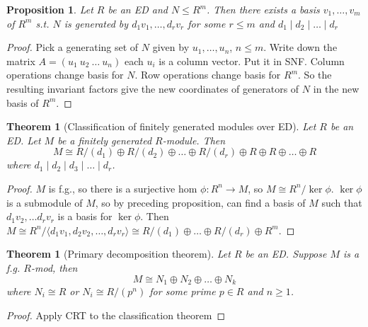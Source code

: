 \documentclass{article}
\theoremstyle{definition}
\theoremstyle{remark}
\theoremstyle{plain}
\newtheorem{thm}[defn]{Theorem}
\newtheorem{prop}[defn]{Proposition}
\theoremstyle{definition}
\begin{document}
\begin{prop}
    Let $R$ be an ED and $N\le R^m$. Then there exists a basis $v_1,\ldots,v_m$ of $R^m$ s.t. $N$ is generated by $d_1v_1,\ldots,d_rv_r$ for some $r\le m$ and $d_1\mid d_2\mid \ldots\mid d_r$
\end{prop}
\begin{proof}
    Pick a generating set of $N$ given by $u_1,\ldots, u_n$, $n\le m$. Write down the matrix $A=(u_1\ u_2\ \ldots\ u_n)$ each $u_i$ is a column vector. Put it in SNF. Column operations change basis for $N$. Row operations change basis for $R^m$. So the resulting invariant factors give the new coordinates of generators of $N$ in the new basis of $R^m$.
\end{proof}
\begin{thm}[Classification of finitely generated modules over ED]
    Let $R$ be an ED. Let $M$ be a finitely generated $R$-module. Then
    \[M\cong R/(d_1)\oplus R/(d_2)\oplus \ldots\oplus R/(d_r)\oplus R\oplus R\oplus\ldots\oplus R\]
    where $d_1\mid d_2\mid d_3\mid\ldots\mid d_r$.
\end{thm}
\begin{proof}
    $M$ is f.g., so there is a surjective hom $\phi:R^n\to M$, so $M\cong R^n/\ker\phi$. $\ker\phi$ is a submodule of $M$, so by preceding proposition, can find a basis of $M$ such that $d_1v_2,\ldots d_rv_r$ is a basis for $\ker\phi$. Then $M\cong R^n/\langle d_1v_1, d_2v_2,\ldots, d_rv_r\rangle\cong R/(d_1)\oplus\ldots\oplus R/(d_r)\oplus R^m$.
\end{proof}
\begin{thm}[Primary decomposition theorem]
    Let $R$ be an ED. Suppose $M$ is a f.g. $R$-mod, then \[M\cong N_1\oplus N_2\oplus\ldots\oplus N_k\]
    where $N_i\cong R$ or $N_i\cong R/(p^n)$ for some prime $p\in R$ and $n\ge 1$. 
\end{thm}
\begin{proof}
    Apply CRT to the classification theorem
\end{proof}
\end{document}
